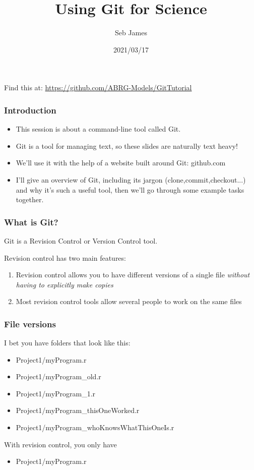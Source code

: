 \documentclass{beamer}
\title{Using Git for Science}
\author{Seb James}
\institute{PSY6422}
\date{2021/03/17}
\begin{document}
\begin{frame}
  \titlepage %
  Find this at: \url{https://github.com/ABRG-Models/GitTutorial}
\end{frame}

\begin{frame}
  \frametitle{Introduction}
  \begin{itemize}
    \item This session is about a command-line tool called Git.

    \item Git is a tool for managing text, so these slides are naturally text
      heavy!

    \item We'll use it with the help of a website built around Git: github.com

    \item I'll give an overview of Git, including its jargon
      (\alert{clone},\alert{commit},\alert{checkout}...) and why it's
      such a useful tool, then we'll go through some example tasks together.
  \end{itemize}
\end{frame}

\begin{frame}
  \frametitle{What is Git?}
  Git is a \alert{Revision Control} or \alert{Version Control} tool.

  Revision control has two main features:

  \begin{enumerate}
    \pause \item Revision control allows you to have different versions of a
      single file \emph{without having to explicitly make copies}
      \pause \item Most revision control tools allow several people to work
      on the same files %
  \end{enumerate}
\end{frame}

\begin{frame}
  \frametitle{File versions}
  I bet you have folders that look like this:
  \pause \begin{itemize}
  \item Project1/myProgram.r
    \pause \item Project1/myProgram\_old.r
  \item Project1/myProgram\_1.r
  \item Project1/myProgram\_thisOneWorked.r
  \item Project1/myProgram\_whoKnowsWhatThisOneIs.r
  \end{itemize}
  \pause With revision control, you only have
  \begin{itemize}
  \item Project1/myProgram.r
  \end{itemize}
\end{frame}
\end{document}
